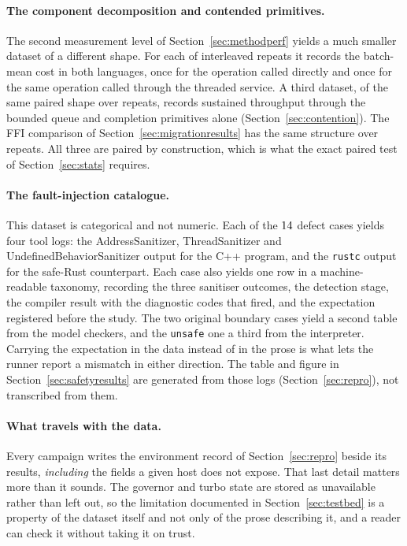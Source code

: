 \documentclass[english,oneside,a4paper,censored,csm,software-track-2020]{HYthesisML}
\begin{document}
\paragraph{The component decomposition and contended primitives.}
The second measurement level of Section~\ref{sec:methodperf} yields a much smaller dataset of a
different shape. For each of \BudgetRepeats{} interleaved repeats it records the batch-mean cost
in both languages, once for the operation called directly and once for the same operation called
through the threaded
service. A third dataset, of the same paired shape over \ContentionRepeats{} repeats, records
sustained throughput through the bounded queue and completion primitives alone
(Section~\ref{sec:contention}). The FFI comparison of Section~\ref{sec:migrationresults} has the
same structure over \FfiOpRepeats{} repeats. All three are paired by construction, which is what
the exact paired test of Section~\ref{sec:stats} requires.

\paragraph{The fault-injection catalogue.}
This dataset is categorical and not numeric. Each of the $14$ defect cases yields four
tool
logs: the AddressSanitizer, ThreadSanitizer and UndefinedBehaviorSanitizer output for the C++
program, and the \texttt{rustc} output for the safe-Rust counterpart. Each case also yields one
row in a machine-readable taxonomy, recording the three sanitiser outcomes, the detection stage,
the compiler result with the diagnostic codes that fired, and the expectation registered before
the study. The two original boundary cases yield a second table from the model checkers, and the
\texttt{unsafe} one a third from the interpreter. Carrying
the expectation in the data instead of in the prose is what lets the runner report a mismatch
in either direction. The table and figure in Section~\ref{sec:safetyresults} are generated from
those logs (Section~\ref{sec:repro}), not transcribed from them.

\paragraph{What travels with the data.}
Every campaign writes the environment record of Section~\ref{sec:repro} beside its results,
\emph{including} the fields a given host does not expose. That last detail matters more than it
sounds. The governor and turbo state are stored as unavailable rather than left out, so the
limitation documented in Section~\ref{sec:testbed} is a property of the dataset itself and not
only of the prose describing it, and a reader can check it without taking it on trust.
\end{document}

